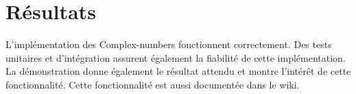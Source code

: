 \section{Résultats}

L'implémentation des \glspl{Complex-number} fonctionnent correctement. Des tests unitaires et d'intégration assurent également la fiabilité de cette implémentation. La démonstration donne également le résultat attendu et montre l'intérêt de cette fonctionnalité. Cette fonctionnalité est aussi documentée dans le wiki.